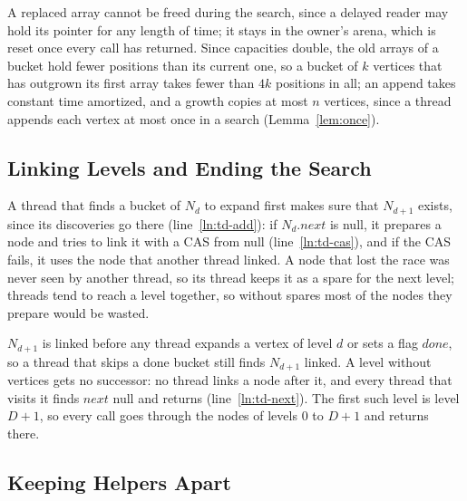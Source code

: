 A replaced array cannot be freed during the search, since a delayed reader may hold its pointer for any length of time; it stays in the owner's arena, which is reset once every call has returned. Since capacities double, the old arrays of a bucket hold fewer positions than its current one, so a bucket of $k$ vertices that has outgrown its first array takes fewer than $4k$ positions in all; an append takes constant time amortized, and a growth copies at most $n$ vertices, since a thread appends each vertex at most once in a search (Lemma~\ref{lem:once}).

\subsection{Linking Levels and Ending the Search}
\label{sec:td-link}

A thread that finds a bucket of $N_d$ to expand first makes sure that $N_{d+1}$ exists, since its discoveries go there (line~\ref{ln:td-add}): if $N_d.\mathit{next}$ is null, it prepares a node and tries to link it with a CAS from null (line~\ref{ln:td-cas}), and if the CAS fails, it uses the node that another thread linked. A node that lost the race was never seen by another thread, so its thread keeps it as a spare for the next level; threads tend to reach a level together, so without spares most of the nodes they prepare would be wasted.

$N_{d+1}$ is linked before any thread expands a vertex of level $d$ or sets a flag $\mathit{done}$, so a thread that skips a done bucket still finds $N_{d+1}$ linked. A level without vertices gets no successor: no thread links a node after it, and every thread that visits it finds $\mathit{next}$ null and returns (line~\ref{ln:td-next}). The first such level is level $D+1$, so every call goes through the nodes of levels $0$ to $D+1$ and returns there.

\subsection{Keeping Helpers Apart}
\label{sec:td-contention}


